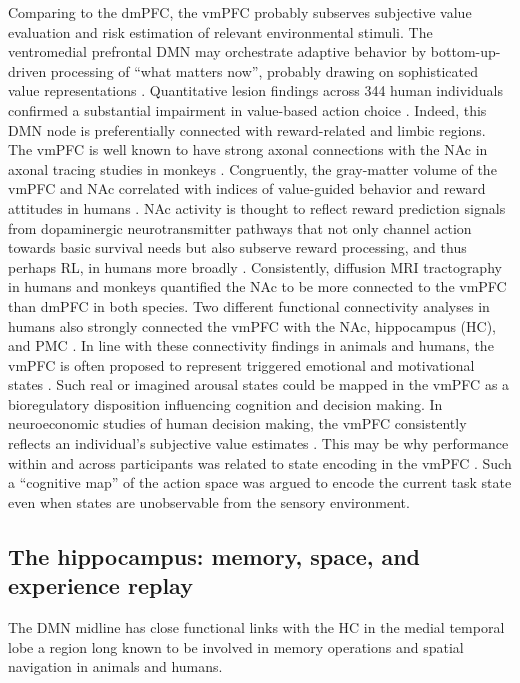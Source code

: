 \documentclass[10pt,letterpaper]{article}
\begin{document}
Comparing to the dmPFC,
the vmPFC probably subserves
subjective value evaluation and
risk estimation of relevant environmental stimuli.
The ventromedial prefrontal DMN may
orchestrate adaptive behavior by bottom-up-driven
processing of “what matters now”,
probably drawing on sophisticated value representations
\citep{rolls_OFC, doherty2015structure}.
Quantitative lesion findings across 344 human individuals confirmed
a substantial impairment in value-based action choice
\citep{glascher2012lesion}.
Indeed,
this DMN node is preferentially connected with reward-related and limbic regions.
The vmPFC is well known to have strong axonal connections
with the NAc
in axonal tracing studies in monkeys \citep{haber1995orbital}.
Congruently, the gray-matter volume of the vmPFC and NAc
correlated with indices of value-guided behavior and reward attitudes
in humans
\citep{lebreton2009automatic}.
NAc activity is thought to reflect reward prediction signals
from dopaminergic neurotransmitter pathways
\citep{schultz1998predictive}
that not only channel action towards basic survival needs but also
subserve reward processing, and thus perhaps RL,
in humans more broadly \citep{doherty2015structure}.
Consistently, diffusion MRI tractography in humans and monkeys
\citep{croxson2005quantitative}
quantified the NAc to
be more connected to the vmPFC than dmPFC in both species.
Two different functional connectivity analyses in humans also strongly connected
the vmPFC with the NAc, hippocampus (HC),
and PMC \citep{bzdok2015subspecialization}.
%
In line with these connectivity findings in animals and humans,
the vmPFC is often proposed to represent triggered
emotional and motivational states \citep{damasio1996somatic}.
Such real or imagined arousal states could be mapped in the vmPFC
as a bioregulatory disposition influencing cognition
and decision making.
In neuroeconomic studies of human decision making,
the vmPFC consistently reflects an individual’s subjective
value estimates
\citep{behrens2008associative}.
This may be why performance within and across participants
was related to state encoding in the vmPFC \citep{Schuck2016}.
Such a ``cognitive map'' of the action space was argued to encode
the current task state even when states are unobservable from the sensory environment.



\subsection{The hippocampus: memory, space, and experience replay}
The DMN midline has close functional links
with the HC in the medial temporal lobe \citep{vincet2006, shannon2013morning} \textemdash
a region long known to be involved in
memory operations and spatial navigation in animals and humans.
\end{document}
